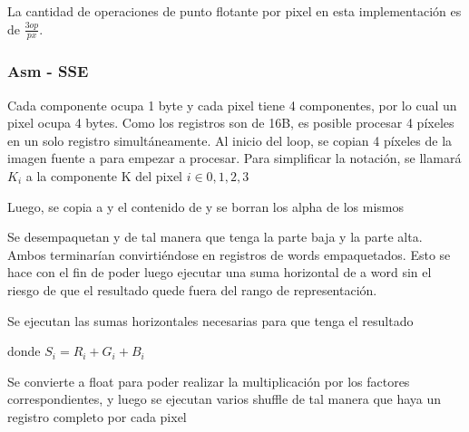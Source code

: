 La cantidad de operaciones de punto flotante por pixel en esta implementación es de $\frac{3op}{px}$.

\subsubsection{Asm - SSE}

Cada componente ocupa 1 byte y cada pixel tiene 4 componentes, por lo cual un pixel ocupa 4 bytes. Como los registros \xmm{} son de 16B, es posible procesar 4 píxeles en un solo registro simultáneamente.
Al inicio del loop, se copian 4 píxeles de la imagen fuente a  para empezar a procesar. Para simplificar la notación, se llamará $K_{i}$ a la componente K del pixel $i \in {0,1,2,3}$

 

Luego, se copia a  y  el contenido de  y se borran los alpha de los mismos

 

 

Se desempaquetan  y  de tal manera que  tenga la parte baja y  la parte alta. Ambos terminarían convirtiéndose en registros de words empaquetados. Esto se hace con el fin de poder luego ejecutar una suma horizontal de a word sin el riesgo de que el resultado quede fuera del rango de representación.

 

 

Se ejecutan las sumas horizontales necesarias para que  tenga el resultado

 

donde $S_{i} = R_{i} + G_{i} + B_{i}$

Se convierte  a float para poder realizar la multiplicación por los factores correspondientes, y luego se ejecutan varios shuffle de tal manera que haya un registro completo por cada pixel


